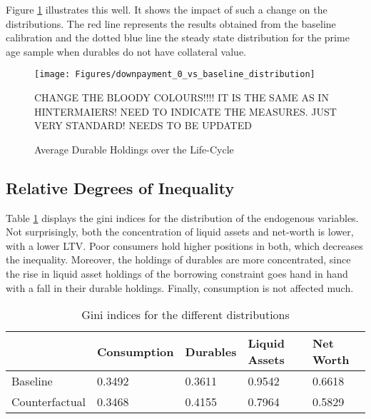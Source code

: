 \documentclass[a4paper,12pt,legno]{article}
\begin{document}
Figure \ref{downpayment_vs_baseline} illustrates this well. It shows the impact of such a change on the distributions. The red line represents the results obtained from the baseline calibration and the dotted blue line the steady state distribution for the prime age sample when durables do not have collateral value. 

\begin{figure}[!htbp]
\caption{Average Durable Holdings over the Life-Cycle} 
\label{downpayment_vs_baseline}	%
\centering
\texttt{[image: Figures/downpayment\_0\_vs\_baseline\_distribution]}  %

\begin{minipage}{0.8\linewidth}
\footnotesize{CHANGE THE BLOODY COLOURS!!!! IT IS THE SAME AS IN HINTERMAIERS! NEED TO INDICATE THE MEASURES. JUST VERY STANDARD! NEEDS TO BE UPDATED}
\end{minipage}

\end{figure}

\subsection{Relative Degrees of Inequality}
Table \ref{Gini_Ranking_counter_factual} displays the gini indices for the distribution of the endogenous variables. Not surprisingly, both the concentration of liquid assets and net-worth is lower, with a lower LTV. Poor consumers hold higher positions in both, which decreases the inequality. Moreover, the holdings of durables are more concentrated, since the rise in liquid asset holdings of the borrowing constraint goes hand in hand with a fall in their durable holdings. Finally, consumption is not affected much. 

\begin{table}[!htbp]
\centering
\caption{Gini indices for the different distributions}
\label{Gini_Ranking_counter_factual}
\begin{tabular}{@{}lllll@{}}
\toprule
      & Consumption & Durables & Liquid Assets & Net Worth \\ \midrule
Baseline & 0.3492       & 0.3611   & 0.9542        & 0.6618    \\ \midrule
Counterfactual  & 0.3468         & 0.4155     & 0.7964          & 0.5829      \\ \bottomrule
\end{tabular}
\end{table}
\end{document}
